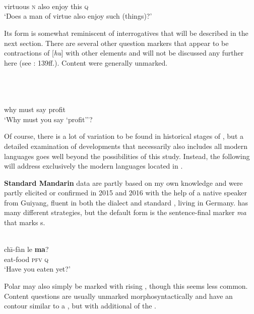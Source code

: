 \ea%
    \label{ex:trans:1}
    \\
    \\
    \\
    virtuous  \textsc{n}  also  enjoy  this  \textsc{q}\\
    \glt ‘Does a man of virtue also enjoy such (things)?’ \citep[139]{Pulleyblank1995}
    \z

\noindent Its form is somewhat reminiscent of interrogatives that will be described in the next section. There are several other question markers that appear to be contractions of [\textit{hu}]  with other elements and will not be discussed any further here (see \citealt{Pulleyblank1995}: 139ff.). Content  were generally unmarked.

\ea%
    \label{ex:trans:2}
    \\
    \\
    \\
    why  must  say  profit\\
    \glt ‘Why must you say ‘profit’’? \citep[145]{Pulleyblank1995}
    \z

Of course, there is a lot of variation to be found in historical stages of , but a detailed examination of  developments that necessarily also includes all modern  languages goes well beyond the possibilities of this study. Instead, the following will address exclusively the modern  languages located in .

\textbf{Standard Mandarin}  data are partly based on my own knowledge and were partly elicited or confirmed in 2015 and 2016 with the help of a native speaker from Guiyang, fluent in both the dialect and standard , living in Germany.   has many different  strategies, but the default form is the sentence-final marker \textit{ma}  that marks s.

\ea%
    \label{ex:trans:3}
    \\
    \gll ch\={\i}-fàn   le \textbf{{ma}}?\\
    eat-food  \textsc{pfv}  \textsc{q}\\
    \glt ‘Have you eaten yet?’
    \z

Polar  may also simply be marked with rising , though this seems less common. Content {questions} are usually unmarked morphosyntactically and have an  contour similar to a , but with additional  of the .

